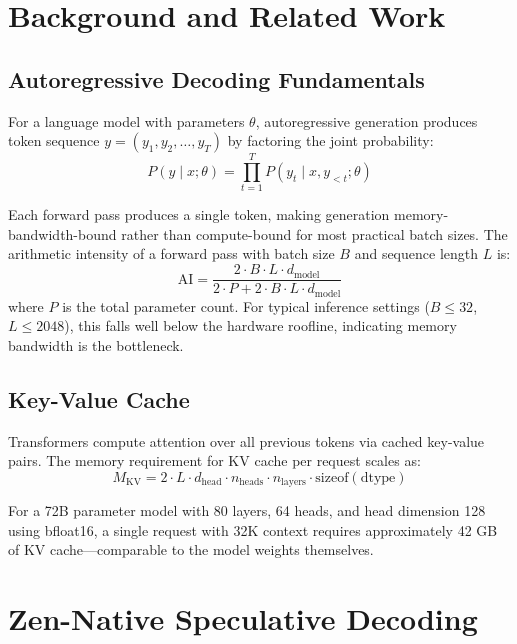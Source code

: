 \documentclass[11pt,a4paper]{article}
\begin{document}
\section{Background and Related Work}

\subsection{Autoregressive Decoding Fundamentals}

For a language model with parameters $\theta$, autoregressive generation produces token sequence $y = (y_1, y_2, \ldots, y_T)$ by factoring the joint probability:
\begin{equation}
P(y \mid x; \theta) = \prod_{t=1}^{T} P(y_t \mid x, y_{<t}; \theta)
\end{equation}

Each forward pass produces a single token, making generation memory-bandwidth-bound rather than compute-bound for most practical batch sizes. The arithmetic intensity of a forward pass with batch size $B$ and sequence length $L$ is:
\begin{equation}
\text{AI} = \frac{2 \cdot B \cdot L \cdot d_{\text{model}}}{2 \cdot P + 2 \cdot B \cdot L \cdot d_{\text{model}}}
\end{equation}
where $P$ is the total parameter count. For typical inference settings ($B \leq 32$, $L \leq 2048$), this falls well below the hardware roofline, indicating memory bandwidth is the bottleneck.

\subsection{Key-Value Cache}

Transformers compute attention over all previous tokens via cached key-value pairs. The memory requirement for KV cache per request scales as:
\begin{equation}
M_{\text{KV}} = 2 \cdot L \cdot d_{\text{head}} \cdot n_{\text{heads}} \cdot n_{\text{layers}} \cdot \text{sizeof}(\text{dtype})
\end{equation}

For a 72B parameter model with 80 layers, 64 heads, and head dimension 128 using bfloat16, a single request with 32K context requires approximately 42 GB of KV cache—comparable to the model weights themselves.

\section{Zen-Native Speculative Decoding}
\end{document}

